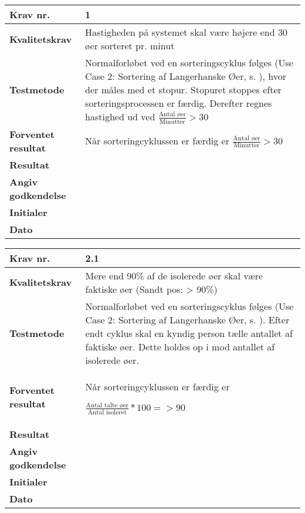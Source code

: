 
 	\begin{center}
		\begin{longtable}{ | m{4cm}| m{8.5cm}|} 
			\hline
			\textbf{Krav nr.} & 1 \\ 
			\hline
			\textbf{Kvalitetskrav} & Hastigheden på systemet skal være højere end 30 øer sorteret pr. minut \\
			\hline
			\textbf{Testmetode} & Normalforløbet ved en sorteringscyklus følges (Use Case 2: Sortering af Langerhanske Øer, s. \pageref{uc:2}), hvor der måles med et stopur. Stopuret stoppes efter sorteringsprocessen er færdig. Derefter regnes hastighed ud ved 
$\frac{\text{Antal øer}}{\text{Minutter}}>30$ \\
			\hline
			\textbf{Forventet resultat}  & Når sorteringcyklussen er færdig er
			$\frac{\text{Antal øer}}{\text{Minutter}}>30$  \\
			\hline
			\textbf{Resultat}  &    \\
			\hline
			\textbf{Angiv godkendelse} &     \\
			\hline
			\textbf{Initialer} &     \\
			\hline
			\textbf{Dato} &    \\
			\hline
		\end{longtable}
	\end{center}
			
 	\begin{center}
		\begin{longtable}{ | m{4cm}| m{8.5cm}|} 
			\hline
			\textbf{Krav nr.} & 2.1 \\ 
			\hline
			\textbf{Kvalitetskrav} & Mere end 90\% af de isolerede øer skal være faktiske øer 
(Sandt pos: > 90\%) \\
			\hline
			\textbf{Testmetode} & Normalforløbet ved en sorteringscyklus følges (Use Case 2: Sortering af Langerhanske Øer, s. \pageref{uc:2}). Efter endt cyklus skal en kyndig person tælle antallet af faktiske øer. Dette holdes op i mod antallet af isolerede øer.  \\
			\hline
			\textbf{Forventet resultat}  & Når sorteringcyklussen er færdig er

 $\frac{\text{Antal talte øer}}{\text{Antal isoleret}}*100=>90$  \\
			\hline
			\textbf{Resultat}  &    \\
			\hline
			\textbf{Angiv godkendelse} &     \\
			\hline
			\textbf{Initialer} &     \\
			\hline
			\textbf{Dato} &    \\
			\hline
		\end{longtable}
	\end{center}		

